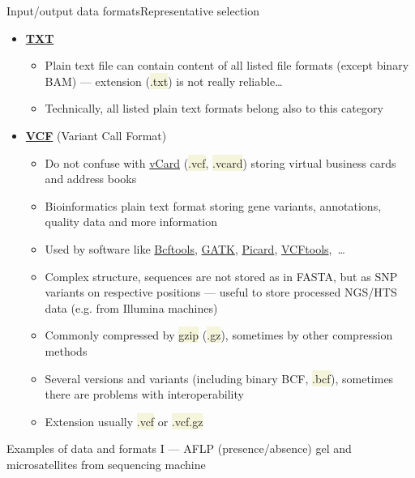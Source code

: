 \documentclass[compress, xelatex, 11pt, xcolor=svgnames, aspectratio=169,
	hyperref={
		bookmarks=true,
		unicode=true,
		colorlinks=true,
		pdftitle={Molecular data in R},
		plainpages=false,
		pdfauthor={Vojtech Zeisek},
		pdfsubject={Course about phylogeny and evolution in R},
		pdfcreator={XeLaTeX},
		pdfkeywords={R, evolution, phylogeny, molecular data},
		linkcolor=Crimson, %
		anchorcolor=Magenta, %
		citecolor=Magenta, %
		filecolor=Magenta, %
		menucolor=Magenta, %
		urlcolor=DodgerBlue, %
		},
	url={hyphens, lowtilde} %
	]{beamer}
\renewcommand{\texttt}[1]{\colorbox{Beige}{{\ttfamily #1}}}
\begin{document}
\begin{frame}[allowframebreaks]{Input/output data formats}{Representative selection}
\begin{itemize}
\begin{itemize}
			\item Extension usually \texttt{*.tsv}, \texttt{*.tab}
		\end{itemize}
		\item \href{https://en.wikipedia.org/wiki/Text_file}{\textbf{TXT}}
		\begin{itemize}
			\item Plain text file can contain content of all listed file formats (except binary BAM) --- extension (\texttt{*.txt}) is not really reliable\ldots
			\item Technically, all listed plain text formats belong also to this category
		\end{itemize}
		\item \href{https://en.wikipedia.org/wiki/Variant_Call_Format}{\textbf{VCF}} (Variant Call Format)
		\begin{itemize}
			\item Do not confuse with \href{https://en.wikipedia.org/wiki/VCard}{vCard} (\texttt{*.vcf}, \texttt{*.vcard}) storing virtual business cards and address books
			\item Bioinformatics plain text format storing gene variants, annotations, quality data and more information
			\item Used by software like \href{https://samtools.github.io/bcftools/}{Bcftools}, \href{https://gatk.broadinstitute.org/hc/en-us}{GATK}, \href{https://broadinstitute.github.io/picard/}{Picard}, \href{https://vcftools.github.io/}{VCFtools},~\ldots
			\item Complex structure, sequences are not stored as in FASTA, but as SNP variants on respective positions --- useful to store processed NGS/HTS data (e.g. from Illumina machines)
			\item Commonly compressed by \texttt{gzip} (\texttt{*.gz}), sometimes by other compression methods
			\item Several versions and variants (including binary BCF, \texttt{*.bcf}), sometimes there are problems with interoperability
			\item Extension usually \texttt{*.vcf} or \texttt{*.vcf.gz}
		\end{itemize}
	\end{itemize}
\end{frame}

\begin{frame}{Examples of data and formats I --- AFLP (presence/absence) gel and microsatellites from sequencing machine}
	\begin{center}
		\texttt{[image: aflp\_ssrs.png]}
	\end{center}
\end{frame}
\end{document}
